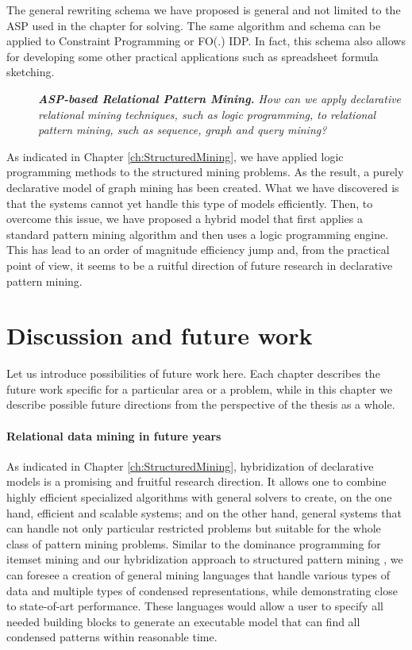 The general rewriting schema we have proposed is general and not
limited to the ASP used in the chapter for solving. The same algorithm
    and schema can be applied to Constraint Programming or FO(.) IDP.
    In fact, this schema also allows for developing some other practical
    applications such as spreadsheet formula sketching.


\begin{description}
    \item[\cfour]  \textit{ \textbf{ASP-based Relational Pattern Mining.}
    How can we apply declarative relational mining techniques, such as
        logic programming, to relational pattern mining, such as sequence, graph and query mining?
}
\end{description}

As indicated in Chapter \ref{ch:StructuredMining}, we have applied 
logic programming methods to the structured mining problems. As the
result, 
a purely declarative model of graph mining has been created. What we
have discovered is that the systems cannot yet handle this type of
models efficiently. Then, to overcome this issue, we have proposed a hybrid model that
first applies a standard pattern mining algorithm and then uses a
logic programming engine. This has lead to an order of magnitude
efficiency jump and, from the practical point of view, it seems to be
a ruitful direction of future research in declarative pattern
mining.

\section{Discussion and future work}
Let us introduce possibilities of future work here. Each chapter
describes the future work specific for a particular area or a problem,
while in this chapter we describe possible future directions from the
perspective of the thesis as a whole.


\paragraph{Relational data mining in future years}
As indicated in Chapter \ref{ch:StructuredMining}, hybridization of
declarative models is a promising and fruitful research direction. It
allows one to combine highly efficient specialized algorithms with
general solvers to create, on the one hand, efficient and scalable
systems; and on the other hand, general systems that can handle not
only particular restricted problems but suitable for the whole class of pattern
mining problems. Similar to the dominance programming for itemset
mining \parencite{dominanceprogramming} and our hybridization approach
to structured pattern mining \parencite{ruleml_hybrid}, we can foresee
a creation of 
general mining languages that handle various types of data and
multiple types of condensed representations, while demonstrating close to
state-of-art performance. These languages would allow a user to
specify all needed building blocks to generate an executable model
that can find all condensed patterns within reasonable time.

